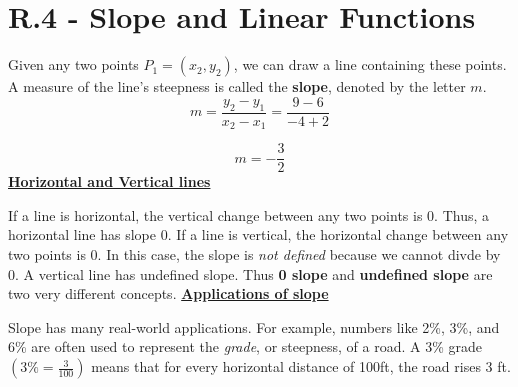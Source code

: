 \documentclass{report}
\begin{document}
\section{R.4 - Slope and Linear Functions}
\bigbreak \noindent
Given any two points $P_1 = (x_2, y_2)$, we can draw a line containing these points. A measure of the line's steepness is called the \textbf{slope}, denoted by the letter $m$.
\bigbreak \noindent \bigbreak \noindent
{}
\bigbreak \noindent \bigbreak \noindent
{}
\bigbreak \noindent
{}
\bigbreak \noindent
$$ m = \frac{y_2 - y_1}{x_2 - x_1} = \frac{9-6}{-4+2}$$

$$ m = -\frac{3}{2}$$
\bigbreak \noindent
{}
\bigbreak \noindent \bigbreak \noindent
\underline{\textbf{Horizontal and Vertical lines}}
\vspace{1em}

\noindent If a line is horizontal, the vertical change between any two points is 0. Thus, a horizontal line has slope 0. If a line is vertical, the horizontal change between any two points is 0. In this case, the slope is \textit{not defined} because we cannot divde by 0. A vertical line has undefined slope. Thus \textbf{0 slope} and \textbf{undefined slope} are two very different concepts.
\bigbreak \noindent \bigbreak \noindent
\underline{\textbf{Applications of slope}}
\vspace{1em}

\noindent Slope has many real-world applications. For example, numbers like 2\%, 3\%, and 6\% are often used to represent the \textit{grade}, or steepness, of a road. A 3\% grade $\left(3\% = \frac{3}{100}\right)$ means that for every horizontal distance of 100ft, the road rises 3 ft.
\vspace{1em}
\end{document}
